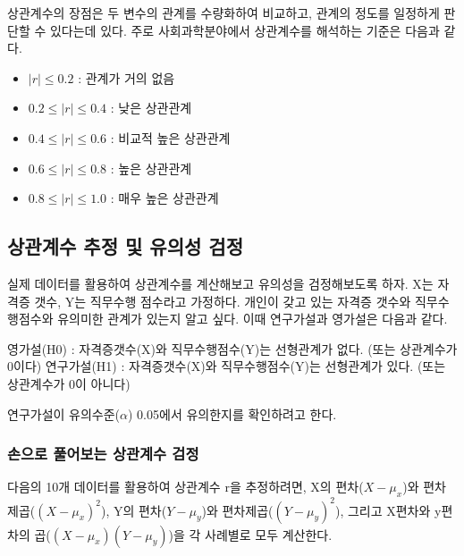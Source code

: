 \documentclass[
]{book}
\providecommand{\tightlist}{%
  \setlength{\itemsep}{0pt}\setlength{\parskip}{0pt}}
\begin{document}
상관계수의 장점은 두 변수의 관계를 수량화하여 비교하고, 관계의 정도를 일정하게 판단할 수 있다는데 있다. 주로 사회과학분야에서 상관계수를 해석하는 기준은 다음과 같다.

\begin{itemize}
\tightlist
\item
  \(|r| \le 0.2\) : 관계가 거의 없음
\item
  \(0.2\le |r| \le 0.4\) : 낮은 상관관계
\item
  \(0.4\le |r| \le 0.6\) : 비교적 높은 상관관계
\item
  \(0.6\le |r| \le 0.8\) : 높은 상관관계
\item
  \(0.8\le |r| \le 1.0\) : 매우 높은 상관관계
\end{itemize}

\subsection{상관계수 추정 및 유의성 검정}\label{uxc0c1uxad00uxacc4uxc218-uxcd94uxc815-uxbc0f-uxc720uxc758uxc131-uxac80uxc815}

실제 데이터를 활용하여 상관계수를 계산해보고 유의성을 검정해보도록 하자. X는 자격증 갯수, Y는 직무수행 점수라고 가정하다. 개인이 갖고 있는 자격증 갯수와 직무수행점수와 유의미한 관계가 있는지 알고 싶다. 이때 연구가설과 영가설은 다음과 같다.

영가설(H0) : 자격증갯수(X)와 직무수행점수(Y)는 선형관계가 없다. (또는 상관계수가 0이다)
연구가설(H1) : 자격증갯수(X)와 직무수행점수(Y)는 선형관계가 있다. (또는 상관계수가 0이 아니다)

연구가설이 유의수준(\(\alpha\)) 0.05에서 유의한지를 확인하려고 한다.

\subsubsection{손으로 풀어보는 상관계수 검정}\label{uxc190uxc73cuxb85c-uxd480uxc5b4uxbcf4uxb294-uxc0c1uxad00uxacc4uxc218-uxac80uxc815}

다음의 10개 데이터를 활용하여 상관계수 r을 추정하려면, X의 편차(\(X-\mu_{x}\))와 편차 제곱(\((X-\mu_{x})^2\)), Y의 편차(\(Y-\mu_{y}\))와 편차제곱(\((Y-\mu_{y})^2\)), 그리고 X편차와 y편차의 곱(\((X-\mu_{x})(Y-\mu_{y})\))을 각 사례별로 모두 계산한다.
\end{document}
